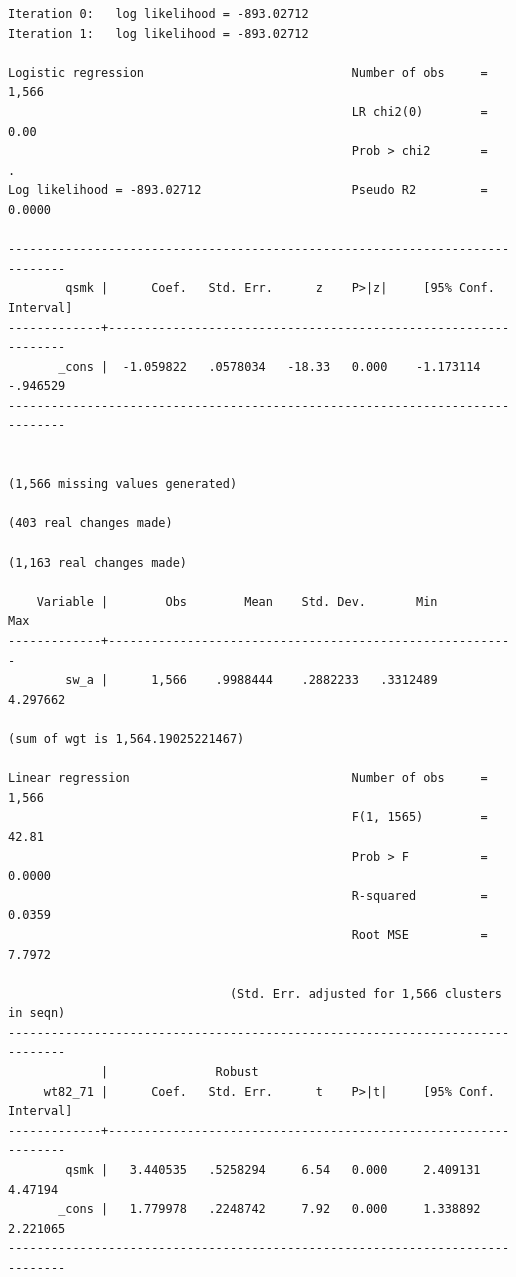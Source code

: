 \documentclass[
  10pt,
]{book}
\begin{document}
\begin{verbatim}
Iteration 0:   log likelihood = -893.02712  
Iteration 1:   log likelihood = -893.02712  

Logistic regression                             Number of obs     =      1,566
                                                LR chi2(0)        =       0.00
                                                Prob > chi2       =          .
Log likelihood = -893.02712                     Pseudo R2         =     0.0000

------------------------------------------------------------------------------
        qsmk |      Coef.   Std. Err.      z    P>|z|     [95% Conf. Interval]
-------------+----------------------------------------------------------------
       _cons |  -1.059822   .0578034   -18.33   0.000    -1.173114    -.946529
------------------------------------------------------------------------------


(1,566 missing values generated)

(403 real changes made)

(1,163 real changes made)

    Variable |        Obs        Mean    Std. Dev.       Min        Max
-------------+---------------------------------------------------------
        sw_a |      1,566    .9988444    .2882233   .3312489   4.297662

(sum of wgt is 1,564.19025221467)

Linear regression                               Number of obs     =      1,566
                                                F(1, 1565)        =      42.81
                                                Prob > F          =     0.0000
                                                R-squared         =     0.0359
                                                Root MSE          =     7.7972

                               (Std. Err. adjusted for 1,566 clusters in seqn)
------------------------------------------------------------------------------
             |               Robust
     wt82_71 |      Coef.   Std. Err.      t    P>|t|     [95% Conf. Interval]
-------------+----------------------------------------------------------------
        qsmk |   3.440535   .5258294     6.54   0.000     2.409131     4.47194
       _cons |   1.779978   .2248742     7.92   0.000     1.338892    2.221065
------------------------------------------------------------------------------


\end{verbatim}
\end{document}

